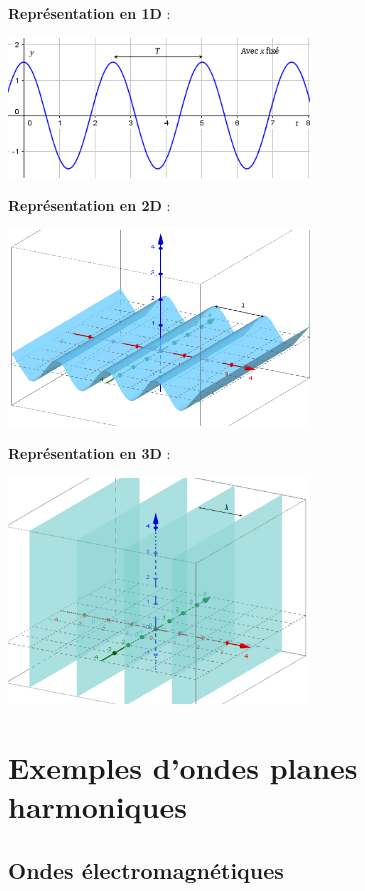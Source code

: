 \noindent\textbf{Représentation en 1D} :
\begin{center}\includegraphics[width=8cm]{img/periode_T.png}\end{center}
\textbf{Représentation en 2D} :
\begin{center}\includegraphics[width=8cm]{img/onde_2D.png}\end{center}
\textbf{Représentation en 3D} :
\begin{center}\includegraphics[width=8cm]{img/onde_3D.png}\end{center}

\section{Exemples d'ondes planes harmoniques}

\subsection{Ondes électromagnétiques}

